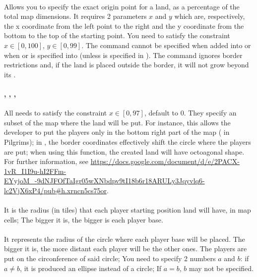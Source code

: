     \paragraph{}
    Allows you to specify the exact origin point for a land, as a percentage of the total map dimensions. It requires 2 parameters $x$ and $y$ which are, respectively, the x coordinate from the left point to the right and the y coordinate from the bottom to the top of the starting point. You need to satisfy the constraint $x \in [0,100]$, $y \in [0, 99]$. The command cannot be specified when added into  or when  or  is specified into  (unless  is specified in ). The command ignores border restrictions and, if the land is placed outside the border, it will not grow beyond its .

    \paragraph{, , , }
    All needs to satisfy the constraint $x \in [0,97]$, default to $0$. They specify an subset of the map where the land will be put. For instance, this allows the developer to put the players only in the bottom right part of the map (\eg{} in Pilgrims); in , the border coordinates effectively shift the circle where the players are put; when using this function, the created land will have octoagonal shape. For further information, see \url{https://docs.google.com/document/d/e/2PACX-1vR_I1I9u-hI2FFm-EYyjoM_-9dNJFOfTaIgr05wXNbdpv9tI18b6r18ARULy3Jqyvlq6-lc2VjX6xP4/pub#h.xrncn5cs75or}.

    \paragraph{}

    \paragraph{}
    It is the radius (in tiles) that each player starting position land will have, in map cells; The bigger it is, the bigger is each player base.

    \paragraph{}
    It represents the radius of the circle where each player base will be placed. The bigger it is, the more distant each player will be \wrt{}the other ones. The players are put on the circonference of said circle; You need to specify 2 numbers $a$ and $b$: if $a \not = b$, it is produced an ellipse instead of a circle; If $a=b$, $b$ may not be specified.


